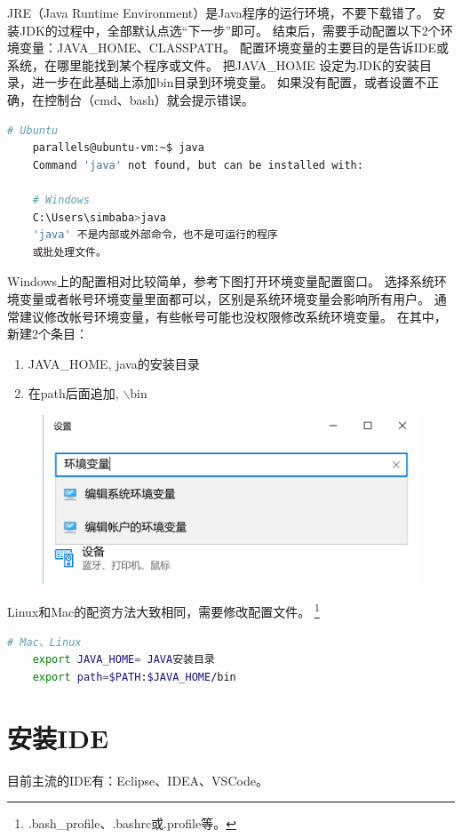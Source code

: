 JRE（Java Runtime Environment）是Java程序的运行环境，不要下载错了。
安装JDK的过程中，全部默认点选“下一步”即可。
结束后，需要手动配置以下2个环境变量：JAVA\_HOME、CLASSPATH。
配置环境变量的主要目的是告诉IDE或系统，在哪里能找到某个程序或文件。
把JAVA\_HOME
设定为JDK的安装目录，进一步在此基础上添加bin目录到环境变量。
如果没有配置，或者设置不正确，在控制台（cmd、bash）就会提示错误。
\begin{lstlisting}[language=bash]
	# Ubuntu
	parallels@ubuntu-vm:~$ java
	Command 'java' not found, but can be installed with:

	# Windows
	C:\Users\simbaba>java
	'java' 不是内部或外部命令，也不是可运行的程序
	或批处理文件。
\end{lstlisting}

Windows上的配置相对比较简单，参考下图打开环境变量配置窗口。
选择系统环境变量或者帐号环境变量里面都可以，区别是系统环境变量会影响所有用户。
通常建议修改帐号环境变量，有些帐号可能也没权限修改系统环境变量。
在其中，新建2个条目：
\begin{enumerate}
	\item JAVA\_HOME, java的安装目录
	\item 在path后面追加, $\backslash$bin
\end{enumerate}

\begin{figure}[!htb]
	\centerline{\includegraphics[width=.4\figwidth]{images/windows_java_home.png}}
\end{figure}

Linux和Mac的配资方法大致相同，需要修改配置文件。
\footnote{.bash\_profile、.bashrc或.profile等。}
\begin{lstlisting}[language=bash]
	# Mac、Linux
	export JAVA_HOME= JAVA安装目录
	export path=$PATH:$JAVA_HOME/bin
\end{lstlisting}

\section{安装IDE}
目前主流的IDE有：Eclipse、IDEA、VSCode。
